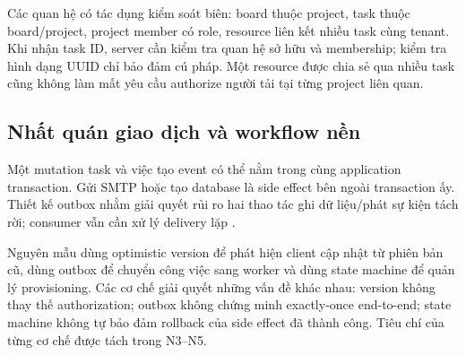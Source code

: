 Các quan hệ có tác dụng kiểm soát biên: board thuộc project, task thuộc board\slash project, project member có role, resource liên kết nhiều task cùng tenant. Khi nhận task ID, server cần kiểm tra quan hệ sở hữu và membership; kiểm tra hình dạng UUID chỉ bảo đảm cú pháp. Một resource được chia sẻ qua nhiều task cũng không làm mất yêu cầu authorize người tải tại từng project liên quan.

\subsection{Nhất quán giao dịch và workflow nền}
Một mutation task và việc tạo event có thể nằm trong cùng application transaction. Gửi SMTP hoặc tạo database là side effect bên ngoài transaction ấy. Thiết kế outbox nhằm giải quyết rủi ro hai thao tác ghi dữ liệu\slash phát sự kiện tách rời; consumer vẫn cần xử lý delivery lặp \citep{awsTransactionalOutbox}.

Nguyên mẫu dùng optimistic version để phát hiện client cập nhật từ phiên bản cũ, dùng outbox để chuyển công việc sang worker và dùng state machine để quản lý provisioning. Các cơ chế giải quyết những vấn đề khác nhau: version không thay thế authorization; outbox không chứng minh exactly-once end-to-end; state machine không tự bảo đảm rollback của side effect đã thành công. Tiêu chí của từng cơ chế được tách trong N3--N5.
